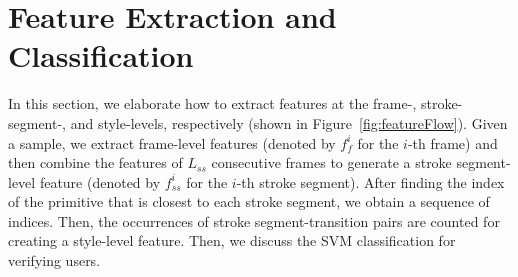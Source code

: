 




\section{Feature Extraction and Classification}
\label{sec:feature}



%



In this section, we elaborate how to extract features at the frame-, stroke-segment-, and style-levels, respectively (shown in Figure~\ref{fig:featureFlow}). Given a sample, we extract frame-level features (denoted by $f_f^i$ for the $i$-th frame) and then combine the features of $L_{ss}$ consecutive frames to generate a stroke segment-level feature (denoted by $f_{ss}^i$ for the $i$-th stroke segment). After finding the index of the primitive that is closest to each stroke segment, we obtain a  sequence of indices. Then, the occurrences of stroke segment-transition pairs are counted for creating a style-level feature. Then, we discuss the SVM classification for verifying users. 



